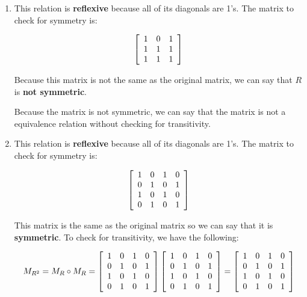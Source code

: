 \documentclass[letterpaper, 12pt]{article}
\begin{document}
\begin{enumerate}
    \item This relation is \textbf{reflexive} because all of its diagonals are 1's. The matrix to check for symmetry is:
    
    \[
    \left[
    \begin{array}{c c c}
         1 & 0 & 1 \\
         1 & 1 & 1 \\
         1 & 1 & 1
    \end{array}
    \right]
    \]
    
    Because this matrix is not the same as the original matrix, we can say that $R$ is \textbf{not symmetric}.
    
    Because the matrix is not symmetric, we can say that the matrix is not a equivalence relation without checking for transitivity.
    
    \item This relation is \textbf{reflexive} because all of its diagonals are 1's. The matrix to check for symmetry is:
    
    \[
    \left[
    \begin{array}{c c c c}
         1 & 0 & 1 & 0 \\
         0 & 1 & 0 & 1 \\
         1 & 0 & 1 & 0 \\
         0 & 1 & 0 & 1
    \end{array}
    \right]
    \]
    
    This matrix is the same as the original matrix so we can say that it is \textbf{symmetric}. To check for transitivity, we have the following:
    
    \[
    M_{R^2} = M_R \circ M_R =
    \left[
    \begin{array}{c c c c}
         1 & 0 & 1 & 0 \\
         0 & 1 & 0 & 1 \\
         1 & 0 & 1 & 0 \\
         0 & 1 & 0 & 1
    \end{array}
    \right]
    \left[
    \begin{array}{c c c c}
         1 & 0 & 1 & 0 \\
         0 & 1 & 0 & 1 \\
         1 & 0 & 1 & 0 \\
         0 & 1 & 0 & 1
    \end{array}
    \right]
    =
    \left[
    \begin{array}{c c c c}
         1 & 0 & 1 & 0 \\
         0 & 1 & 0 & 1 \\
         1 & 0 & 1 & 0 \\
         0 & 1 & 0 & 1
    \end{array}
    \right]
    \]
    

\end{enumerate}
\end{document}
